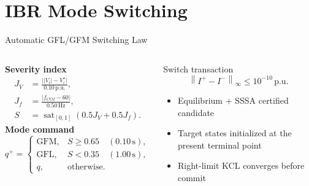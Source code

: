 \documentclass{beamer}
\newcommand{\pu}{\,\mathrm{p.u.}}
\begin{document}
\section{IBR Mode Switching}
\begin{frame}{Automatic GFL/GFM Switching Law}
\begin{columns}[c,onlytextwidth]
\footnotesize
\textbf{Severity index}
\begin{align*}
J_V&=\frac{\bigl||V_i|-V_i^{\star}\bigr|}{0.10\pu},\\
J_f&=\frac{|f_{COI}-60|}{0.50\,\mathrm{Hz}},\\
S&=\operatorname{sat}_{[0,1]}\!\left(0.5J_V+0.5J_f\right).
\end{align*}
\textbf{Mode command}
\[
q^+=\begin{cases}
\mathrm{GFM},&S\ge0.65\quad(0.10\,\mathrm{s}),\\
\mathrm{GFL},&S<0.35\quad(1.00\,\mathrm{s}),\\
q,&\text{otherwise}.
\end{cases}
\]
\small
\begin{block}{Switch transaction}
\[
\boxed{\left\|I^{+}-I^{-}\right\|_{\infty}\le10^{-10}\pu}
\]
\begin{itemize}
  \item Equilibrium + SSSA certified candidate
  \item Target states initialized at the present terminal point
  \item Right-limit KCL converges before commit
\end{itemize}
\end{block}
\end{columns}
\end{frame}

\end{document}
